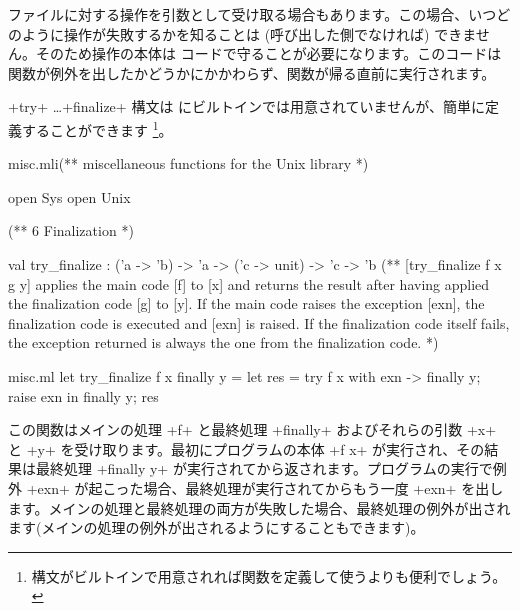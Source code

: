 ファイルに対する操作を引数として受け取る場合もあります。この場合、いつどのように操作が失敗するかを知ることは (呼び出した側でなければ) できません。そのため操作の本体は  コードで守ることが必要になります。このコードは関数が例外を出したかどうかにかかわらず、関数が帰る直前に実行されます。

\ml+try+ \ldots \ml+finalize+ 構文は \ocaml にビルトインでは用意されていませんが、簡単に定義することができます \footnote{構文がビルトインで用意されれば関数を定義して使うよりも便利でしょう。}。\begin{codefile}{misc.mli}(** miscellaneous functions for the Unix library *)

open Sys
open Unix

(** {6 Finalization} *)

val try_finalize : ('a -> 'b) -> 'a -> ('c -> unit) -> 'c -> 'b
(** [try_finalize f x g y] applies the main code [f] to [x] and
   returns the result after having applied the finalization
   code [g] to [y]. If the main code raises the exception
   [exn], the finalization code is executed and [exn] is raised.
   If the finalization code itself fails, the exception
   returned is always the one from the finalization code. *)
\end{codefile}
%
\begin{listingcodefile}{misc.ml}
let try_finalize f x finally y =
  let res = try f x with exn -> finally y; raise exn in
  finally y;
  res
\end{listingcodefile}
%
この関数はメインの処理 \ml+f+ と最終処理 \ml+finally+ およびそれらの引数 \ml+x+ と \ml+y+ を受け取ります。最初にプログラムの本体 \ml+f x+ が実行され、その結果は最終処理 \ml+finally y+ が実行されてから返されます。プログラムの実行で例外 \ml+exn+ が起こった場合、最終処理が実行されてからもう一度 \ml+exn+ を出します。メインの処理と最終処理の両方が失敗した場合、最終処理の例外が出されます(メインの処理の例外が出されるようにすることもできます)。

